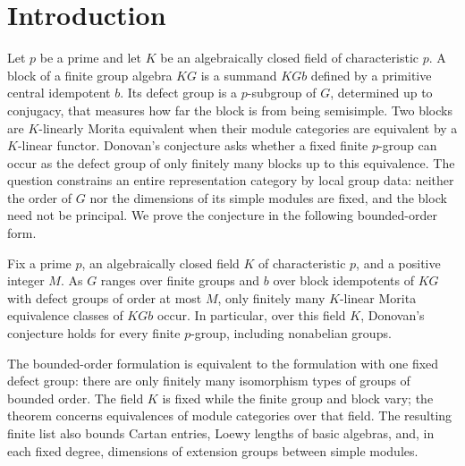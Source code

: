 \begin{abstract}
We prove Donovan's conjecture over every algebraically closed field
\(K\) of characteristic \(p>0\). For each fixed \(K\) and bound on
defect-group order, blocks of finite groups represent only finitely
many \(K\)-linear Morita equivalence classes. The defect groups need
not be abelian, and the result includes \(p=2\).
\end{abstract}

\section{Introduction}
\label{sec:introduction}

Let \(p\) be a prime and let \(K\) be an algebraically closed field
of characteristic \(p\).
A block of a finite group algebra \(KG\) is a summand \(KGb\)
defined by a primitive central idempotent \(b\).  Its defect group
is a \(p\)-subgroup of \(G\), determined up to conjugacy, that
measures how far the block is from being semisimple.  Two blocks
are \(K\)-linearly Morita equivalent when their module categories
are equivalent by a \(K\)-linear functor.  Donovan's conjecture
asks whether a fixed finite \(p\)-group can occur as the defect
group of only finitely many blocks up to this equivalence.
The question constrains an entire representation category by
local group data: neither the order of \(G\) nor the dimensions
of its simple modules are fixed, and the block need not be principal.
We prove the conjecture in the following bounded-order form.

\begin{theorem}
\label{thm:donovan}
Fix a prime \(p\), an algebraically closed field \(K\) of
characteristic \(p\), and a positive integer \(M\).
As \(G\) ranges over finite groups and \(b\) over block idempotents of
\(KG\) with defect groups of order at most \(M\), only finitely many
\(K\)-linear Morita equivalence classes of \(KGb\) occur.
In particular, over this field \(K\), Donovan's conjecture holds for every finite
\(p\)-group, including nonabelian groups.
\end{theorem}

The bounded-order formulation is equivalent to the formulation with
one fixed defect group: there are only finitely many isomorphism
types of groups of bounded order.  The field \(K\) is fixed while
the finite group and block vary; the theorem concerns equivalences
of module categories over that field.  The resulting finite list also
bounds Cartan entries, Loewy lengths of basic algebras, and, in each
fixed degree, dimensions of extension groups between simple modules.

